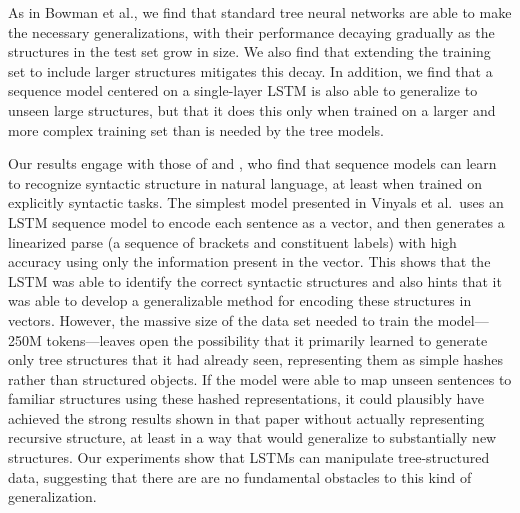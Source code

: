 As in Bowman et al., we find that standard tree neural networks are able to make the necessary generalizations, with their performance decaying gradually as the structures in the test set grow in size. We also find that extending the training set to include larger structures mitigates this decay. In addition, we find that a sequence model centered on a single-layer LSTM is also able to generalize to unseen large structures, but that it does this only when trained on a larger and more complex training set than is needed by the tree models. 

Our results engage with those of  and , who find that sequence models can learn to recognize syntactic structure in natural language, at least when trained on explicitly syntactic tasks. The simplest model presented in Vinyals et al.~uses an LSTM sequence model to encode each sentence as a vector, and then generates a linearized parse (a sequence of brackets and constituent labels) with high accuracy using only the information present in the vector. This shows that the LSTM was able to identify the correct syntactic structures and also hints that it was able to develop a generalizable method for encoding these structures in vectors. However, the massive size of the data set needed to train the model---250M tokens---leaves open the possibility that it primarily learned to generate only tree structures that it had already seen, representing them as simple hashes rather than structured objects. If the model were able to map unseen sentences to familiar structures using these hashed representations, it could plausibly have achieved the strong results shown in that paper without actually representing recursive structure, at least in a way that would generalize to substantially new structures. Our experiments show that LSTMs can manipulate tree-structured data, suggesting that there are are no fundamental obstacles to this kind of generalization.